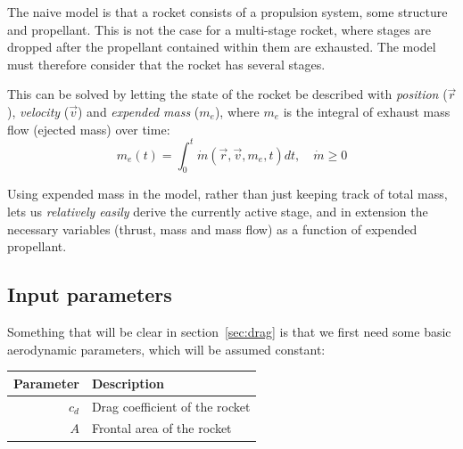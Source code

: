 \documentclass[11pt]{article}
\begin{document}
The naive model is that a rocket consists of a propulsion system, some structure and propellant. 
This is not the case for a multi-stage rocket,
where stages are dropped after the propellant contained within them are exhausted. 
The model must therefore consider that the rocket has several stages.

This can be solved by letting the state of the rocket be described with 
\textit{position} ($\vec{r}$), 
\textit{velocity} ($\vec{v}$) and 
\textit{expended mass} ($m_e$),
where $m_e$ is the integral of exhaust mass flow (ejected mass) over time:
$$
m_e(t) = \int_0^t \dot{m}(\vec{r},\vec{v},m_e,t) dt, \quad \dot{m} \geq 0
$$

Using expended mass in the model, rather than just keeping track of total mass, lets us \textit{relatively easily} derive the currently active stage, 
and in extension the necessary variables (thrust, mass and mass flow) as a function of expended propellant. 

\subsection{Input parameters} \label{sec:rocketparams}
Something that will be clear in section~\ref{sec:drag} is that we first need some basic aerodynamic parameters,
which will be assumed constant:
\begin{center}
\begin{tabular}{ r  | l  }
  Parameter & Description \\
  \hline
  $c_d$ & Drag coefficient of the rocket \\
  $A$ & Frontal area of the rocket
\end{tabular}
\end{center}
\end{document}
